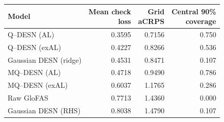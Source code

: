 \begin{tabular*}{\linewidth}{@{\extracolsep{\fill}}lrrr@{}}
\toprule
Model & \shortstack{Mean check\\loss} & \shortstack{Grid\\aCRPS} & \shortstack{Central 90\%\\coverage} \\
\midrule
Q--DESN (AL) & 0.3595 & 0.7156 & 0.750 \\
Q--DESN (exAL) & 0.4227 & 0.8266 & 0.536 \\
Gaussian DESN (ridge) & 0.4531 & 0.8471 & 0.107 \\
MQ--DESN (AL) & 0.4718 & 0.9490 & 0.786 \\
MQ--DESN (exAL) & 0.6037 & 1.1765 & 0.286 \\
Raw GloFAS & 0.7713 & 1.4360 & 0.000 \\
Gaussian DESN (RHS) & 0.8038 & 1.4790 & 0.107 \\
\bottomrule
\end{tabular*}
